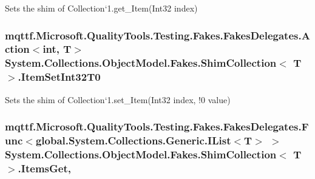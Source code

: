 Sets the shim of Collection`1.get\-\_\-\-Item(\-Int32 index)

\hypertarget{class_system_1_1_collections_1_1_object_model_1_1_fakes_1_1_shim_collection_3_01_t_01_4_a64d9c243169100ebaba5a98297ea484f}{
\subsubsection[{Item\-Set\-Int32\-T0}]{\setlength{\rightskip}{0pt plus 5cm}mqttf.\-Microsoft.\-Quality\-Tools.\-Testing.\-Fakes.\-Fakes\-Delegates.\-Action$<$int, T$>$ System.\-Collections.\-Object\-Model.\-Fakes.\-Shim\-Collection$<$ T $>$.Item\-Set\-Int32\-T0\hspace{0.3cm}{\ttfamily [set]}}}\label{class_system_1_1_collections_1_1_object_model_1_1_fakes_1_1_shim_collection_3_01_t_01_4_a64d9c243169100ebaba5a98297ea484f}


Sets the shim of Collection`1.set\-\_\-\-Item(Int32 index, !0 value)

\hypertarget{class_system_1_1_collections_1_1_object_model_1_1_fakes_1_1_shim_collection_3_01_t_01_4_ab467dff7f2ae47a7e3885390eb05b889}{
\subsubsection[{Items\-Get}]{\setlength{\rightskip}{0pt plus 5cm}mqttf.\-Microsoft.\-Quality\-Tools.\-Testing.\-Fakes.\-Fakes\-Delegates.\-Func$<$global.\-System.\-Collections.\-Generic.\-I\-List$<$T$>$ $>$ System.\-Collections.\-Object\-Model.\-Fakes.\-Shim\-Collection$<$ T $>$.Items\-Get\hspace{0.3cm}{\ttfamily [get]}, {\ttfamily [set]}}}\label{class_system_1_1_collections_1_1_object_model_1_1_fakes_1_1_shim_collection_3_01_t_01_4_ab467dff7f2ae47a7e3885390eb05b889}


